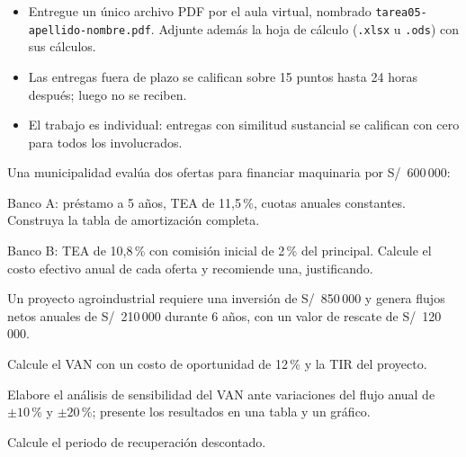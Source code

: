 \documentclass{evaluacion}
\begin{document}
\membrete

\begin{instrucciones}
\begin{itemize}
  \item Entregue un único archivo PDF por el aula virtual, nombrado
        \texttt{tarea05-apellido-nombre.pdf}. Adjunte además la hoja de
        cálculo (\texttt{.xlsx} u \texttt{.ods}) con sus cálculos.
  \item Las entregas fuera de plazo se califican sobre 15 puntos hasta
        24 horas después; luego no se reciben.
  \item El trabajo es individual: entregas con similitud sustancial se
        califican con cero para todos los involucrados.
\end{itemize}
\end{instrucciones}

\begin{ejercicio}
Una municipalidad evalúa dos ofertas para financiar maquinaria por
S/~600\,000:
\begin{apartados}
  \item Banco A: préstamo a 5 años, TEA de 11{,}5\,\%, cuotas anuales
        constantes. Construya la tabla de amortización completa. 
  \item Banco B: TEA de 10{,}8\,\% con comisión inicial de 2\,\% del
        principal. Calcule el costo efectivo anual de cada oferta y
        recomiende una, justificando. 
\end{apartados}
\end{ejercicio}

\begin{ejercicio}
Un proyecto agroindustrial requiere una inversión de S/~850\,000 y genera
flujos netos anuales de S/~210\,000 durante 6 años, con un valor de
rescate de S/~120\,000.
\begin{apartados}
  \item Calcule el VAN con un costo de oportunidad de 12\,\% y la TIR del
        proyecto. 
  \item Elabore el análisis de sensibilidad del VAN ante variaciones del
        flujo anual de $\pm 10\,\%$ y $\pm 20\,\%$; presente los
        resultados en una tabla y un gráfico. 
  \item Calcule el periodo de recuperación descontado. 
\end{apartados}
\end{ejercicio}
\end{document}
